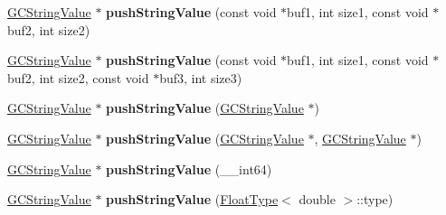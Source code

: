 \begin{DoxyCompactItemize}
\item 
\hyperlink{struct_object_script_1_1_o_s_1_1_core_1_1_g_c_string_value}{G\+C\+String\+Value} $\ast$ {\bfseries push\+String\+Value} (const void $\ast$buf1, int size1, const void $\ast$buf2, int size2)\hypertarget{class_object_script_1_1_o_s_1_1_core_a42a7ccb089a96720f545c6f18a4a9b80}{}\label{class_object_script_1_1_o_s_1_1_core_a42a7ccb089a96720f545c6f18a4a9b80}

\item 
\hyperlink{struct_object_script_1_1_o_s_1_1_core_1_1_g_c_string_value}{G\+C\+String\+Value} $\ast$ {\bfseries push\+String\+Value} (const void $\ast$buf1, int size1, const void $\ast$buf2, int size2, const void $\ast$buf3, int size3)\hypertarget{class_object_script_1_1_o_s_1_1_core_a6872f5ece317d10db39008889269cfab}{}\label{class_object_script_1_1_o_s_1_1_core_a6872f5ece317d10db39008889269cfab}

\item 
\hyperlink{struct_object_script_1_1_o_s_1_1_core_1_1_g_c_string_value}{G\+C\+String\+Value} $\ast$ {\bfseries push\+String\+Value} (\hyperlink{struct_object_script_1_1_o_s_1_1_core_1_1_g_c_string_value}{G\+C\+String\+Value} $\ast$)\hypertarget{class_object_script_1_1_o_s_1_1_core_aa58351e80b584e1f519b0889f5564994}{}\label{class_object_script_1_1_o_s_1_1_core_aa58351e80b584e1f519b0889f5564994}

\item 
\hyperlink{struct_object_script_1_1_o_s_1_1_core_1_1_g_c_string_value}{G\+C\+String\+Value} $\ast$ {\bfseries push\+String\+Value} (\hyperlink{struct_object_script_1_1_o_s_1_1_core_1_1_g_c_string_value}{G\+C\+String\+Value} $\ast$, \hyperlink{struct_object_script_1_1_o_s_1_1_core_1_1_g_c_string_value}{G\+C\+String\+Value} $\ast$)\hypertarget{class_object_script_1_1_o_s_1_1_core_a46851c39492ddbff79c040afbcbd4a4f}{}\label{class_object_script_1_1_o_s_1_1_core_a46851c39492ddbff79c040afbcbd4a4f}

\item 
\hyperlink{struct_object_script_1_1_o_s_1_1_core_1_1_g_c_string_value}{G\+C\+String\+Value} $\ast$ {\bfseries push\+String\+Value} (\+\_\+\+\_\+int64)\hypertarget{class_object_script_1_1_o_s_1_1_core_afc049da949c69194b3093178292ab8ec}{}\label{class_object_script_1_1_o_s_1_1_core_afc049da949c69194b3093178292ab8ec}

\item 
\hyperlink{struct_object_script_1_1_o_s_1_1_core_1_1_g_c_string_value}{G\+C\+String\+Value} $\ast$ {\bfseries push\+String\+Value} (\hyperlink{struct_object_script_1_1_float_type}{Float\+Type}$<$ double $>$\+::type)\hypertarget{class_object_script_1_1_o_s_1_1_core_a4dc2fc9d285aab383343bdde23f7e0d1}{}\label{class_object_script_1_1_o_s_1_1_core_a4dc2fc9d285aab383343bdde23f7e0d1}


\end{DoxyCompactItemize}
